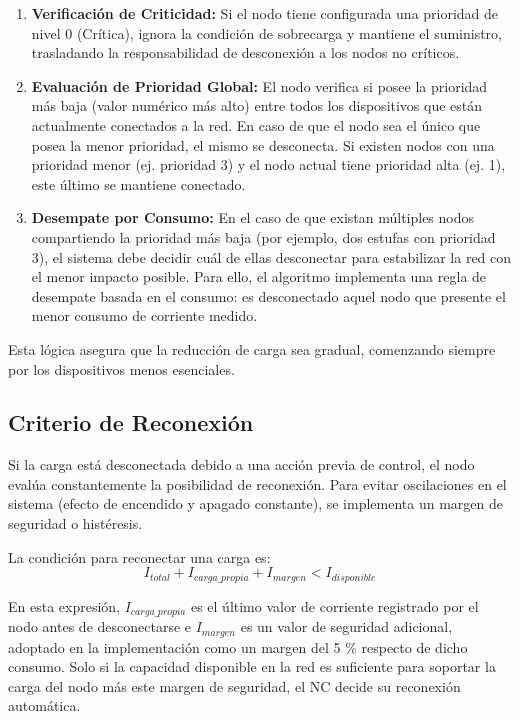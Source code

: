 \begin{enumerate}
    \item \textbf{Verificación de Criticidad:} Si el nodo tiene configurada una prioridad de nivel 0 (Crítica), ignora la condición de sobrecarga y mantiene el suministro, trasladando la responsabilidad de desconexión a los nodos no críticos.
    \item \textbf{Evaluación de Prioridad Global:} El nodo verifica si posee la prioridad más baja (valor numérico más alto) entre todos los dispositivos que están actualmente conectados a la red. En caso de que el nodo sea el único que posea la menor prioridad, el mismo se desconecta. Si existen nodos con una prioridad menor (ej. prioridad 3) y el nodo actual tiene prioridad alta (ej. 1), este último se mantiene conectado.
    \item \textbf{Desempate por Consumo:} En el caso de que existan múltiples nodos compartiendo la prioridad más baja (por ejemplo, dos estufas con prioridad 3), el sistema debe decidir cuál de ellas desconectar para estabilizar la red con el menor impacto posible. Para ello, el algoritmo implementa una regla de desempate basada en el consumo: es desconectado aquel nodo que presente el menor consumo de corriente medido.
\end{enumerate}

Esta lógica asegura que la reducción de carga sea gradual, comenzando siempre por los dispositivos menos esenciales.

\subsection{Criterio de Reconexión}
Si la carga está desconectada debido a una acción previa de control, el nodo evalúa constantemente la posibilidad de reconexión. Para evitar oscilaciones en el sistema (efecto de encendido y apagado constante), se implementa un margen de seguridad o histéresis.

La condición para reconectar una carga es:
\begin{equation}
    \label{eq:reconexion}
    I_{total} + I_{carga\_propia} + I_{margen} < I_{disponible}
\end{equation}

En esta expresión, $I_{carga\_propia}$ es el último valor de corriente registrado por el nodo antes de desconectarse e $I_{margen}$ es un valor de seguridad adicional, adoptado en la implementación como un margen del 5 \% respecto de dicho consumo. Solo si la capacidad disponible en la red es suficiente para soportar la carga del nodo más este margen de seguridad, el NC decide su reconexión automática.

